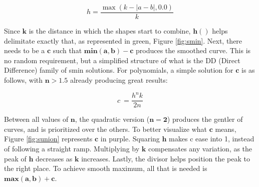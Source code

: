 \begin{equation}
    h = \frac{\max(k - |a - b|, 0.0)}{k}
    \label{eq:example_equation}
\end{equation}

Since $\mathbf{k}$ is the distance in which the shapes start to combine, $\mathbf{h()}$ helps delimitate exactly that, as represented in green, Figure \ref{fig:smin}. Next, there needs to be a $\mathbf{c}$ such that $\mathbf{min(a,b)-c}$ produces the smoothed curve. This is no random requirement, but a simplified structure of what is the DD (Direct Difference) family of smin solutions. For polynomials, a simple solution for $\mathbf{c}$ is as follows, with $\mathbf{n>1.5}$ already producing great results:

\begin{equation}
    c\ =\frac{h^{n}k}{2n}
    \label{eq:example_equation}
\end{equation}

Between all values of $\mathbf{n}$, the quadratic version ($\mathbf{n=2}$) produces the gentler of curves, and is prioritized over the others. To better visualize what $\mathbf{c}$ means, Figure \ref{fig:sunion} represents $\mathbf{c}$ in purple. Squaring $\mathbf{h}$ makes c ease into 1, instead of following a straight ramp. Multiplying by $\mathbf{k}$ compensates any variation, as the peak of $\mathbf{h}$ decreases as $\mathbf{k}$ increases. Lastly, the divisor helps position the peak to the right place.
To achieve smooth maximum, all that is needed is $\mathbf{max(a,b)+c}$.

